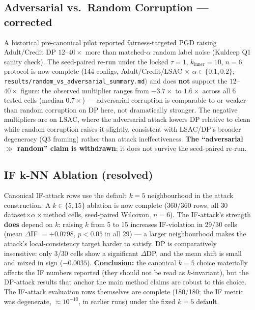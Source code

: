 \documentclass[11pt,a4paper]{article}
\begin{document}
\subsection{Adversarial vs.\ Random Corruption --- corrected}

A historical pre-canonical pilot reported fairness-targeted PGD raising
Adult/Credit DP $12$--$40\times$ more than matched-$\alpha$ random label
noise (Kuldeep Q1 sanity check). The seed-paired re-run under the locked
$\tau{=}1$, $k_{\mathrm{inner}}{=}10$, $n{=}6$ protocol is now complete
(144 configs, Adult/Credit/LSAC $\times$ $\alpha\in\{0.1,0.2\}$;
\texttt{results/random\_vs\_adversarial\_summary.md}) and does
\textbf{not} support the $12$--$40\times$ figure: the observed
multiplier ranges from $-3.7\times$ to $1.6\times$ across all 6 tested
cells (median $0.7\times$) --- adversarial corruption is comparable to
or weaker than random corruption on DP here, not dramatically stronger.
The negative multipliers are on LSAC, where the adversarial attack
lowers DP relative to clean while random corruption raises it slightly,
consistent with LSAC/DP's broader degeneracy (Q3 framing) rather than
attack ineffectiveness. \textbf{The ``adversarial $\gg$ random'' claim
is withdrawn}; it does not survive the seed-paired re-run.

\subsection{IF k-NN Ablation (resolved)}

Canonical IF-attack rows use the default $k{=}5$ neighbourhood in the
attack construction. A $k\in\{5,15\}$ ablation is now complete
(360/360 rows, all 30 dataset$\times\alpha\times$method cells,
seed-paired Wilcoxon, $n{=}6$). The IF-attack's strength \textbf{does}
depend on $k$: raising $k$ from 5 to 15 increases IF-violation in
29/30 cells (mean $\Delta$IF $=+0.0798$, $p{<}0.05$ in all 29) --- a
larger neighbourhood makes the attack's local-consistency target
harder to satisfy. DP is comparatively insensitive: only 3/30 cells
show a significant $\Delta$DP, and the mean shift is small and mixed
in sign ($-0.0035$). \textbf{Conclusion:} the canonical $k{=}5$ choice
materially affects the IF numbers reported (they should not be
read as $k$-invariant), but the DP-attack results that anchor the
main method claims are robust to this choice. The IF-attack
evaluation rows themselves are complete (180/180; the IF metric was
degenerate, $\approx10^{-10}$, in earlier runs) under the fixed
$k{=}5$ default.
\end{document}

